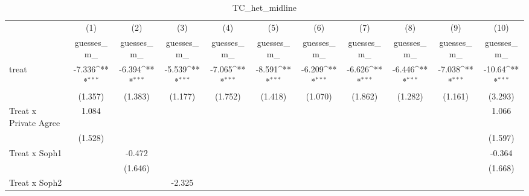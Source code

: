 \begin{table}[htbp]\centering
\def\sym#1{\ifmmode^{#1}\else\(^{#1}\)\fi}
\caption{TC\_het\_midline}
\begin{tabular}{l*{10}{c}}
\hline\hline
                                &\multicolumn{1}{c}{(1)}&\multicolumn{1}{c}{(2)}&\multicolumn{1}{c}{(3)}&\multicolumn{1}{c}{(4)}&\multicolumn{1}{c}{(5)}&\multicolumn{1}{c}{(6)}&\multicolumn{1}{c}{(7)}&\multicolumn{1}{c}{(8)}&\multicolumn{1}{c}{(9)}&\multicolumn{1}{c}{(10)}\\
                                &\multicolumn{1}{c}{guesses\_m\_}&\multicolumn{1}{c}{guesses\_m\_}&\multicolumn{1}{c}{guesses\_m\_}&\multicolumn{1}{c}{guesses\_m\_}&\multicolumn{1}{c}{guesses\_m\_}&\multicolumn{1}{c}{guesses\_m\_}&\multicolumn{1}{c}{guesses\_m\_}&\multicolumn{1}{c}{guesses\_m\_}&\multicolumn{1}{c}{guesses\_m\_}&\multicolumn{1}{c}{guesses\_m\_}\\
\hline
treat                           &   -7.336\sym{***}&   -6.394\sym{***}&   -5.539\sym{***}&   -7.065\sym{***}&   -8.591\sym{***}&   -6.209\sym{***}&   -6.626\sym{***}&   -6.446\sym{***}&   -7.038\sym{***}&   -10.64\sym{***}\\
                                &  (1.357)         &  (1.383)         &  (1.177)         &  (1.752)         &  (1.418)         &  (1.070)         &  (1.862)         &  (1.282)         &  (1.161)         &  (3.293)         \\
Treat x Private Agree           &    1.084         &                  &                  &                  &                  &                  &                  &                  &                  &    1.066         \\
                                &  (1.528)         &                  &                  &                  &                  &                  &                  &                  &                  &  (1.597)         \\
Treat x Soph1                   &                  &   -0.472         &                  &                  &                  &                  &                  &                  &                  &   -0.364         \\
                                &                  &  (1.646)         &                  &                  &                  &                  &                  &                  &                  &  (1.668)         \\
Treat x Soph2                   &                  &                  &   -2.325         &                  &                  &                  &                  &                  &                  &                  \\

\end{tabular}
\end{table}
